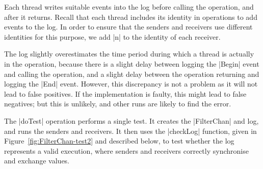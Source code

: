 Each thread writes suitable events into the log before calling the operation,
and after it returns.  Recall that each thread includes its identity in
operations to add events to the log.  In order to ensure that the senders and
receivers use different identities for this purpose, we add |n| to the
identity of each receiver.

The log slightly overestimates the time period during which a thread is
actually in the operation, because there is a slight delay between logging the
|Begin| event and calling the operation, and a slight delay between the
operation returning and logging the |End| event.  However, this discrepancy is
not a problem as it will not lead to false positives.  If the implementation
is faulty, this might lead to false negatives; but this is unlikely, and other
runs are likely to find the error.

The |doTest| operation performs a single test.  It creates the |FilterChan|
and log, and runs the senders and receivers.  It then uses the |checkLog|
function, given in Figure~\ref{fig:FilterChan-test2} and described below, to
test whether the log represents a valid execution, where senders and receivers
correctly synchronise and exchange values.



